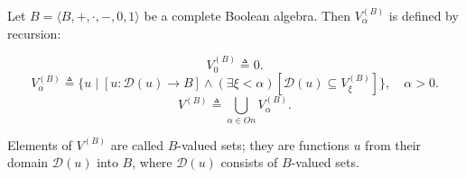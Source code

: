 Let $B = \langle B, +, \cdot, -, 0, 1 \rangle$ be a complete Boolean algebra. Then $V_{\alpha}^{(B)}$ is defined by recursion:

$$V_{0}^{(B)} \triangleq 0.$$
$$V_{\alpha}^{(B)} \triangleq \{u \mid [u: \mathcal{D}(u) \rightarrow B] \land (\exists \xi < \alpha)[\mathcal{D}(u) \subseteq V_{\xi}^{(B)}]\}, \quad \alpha > 0.$$
$$V^{(B)} \triangleq \bigcup_{\alpha \in On} V_{\alpha}^{(B)}.$$

Elements of $V^{(B)}$ are called $B$-valued sets; they are functions $u$ from their domain $\mathcal{D}(u)$ into $B$, where $\mathcal{D}(u)$ consists of $B$-valued sets.
